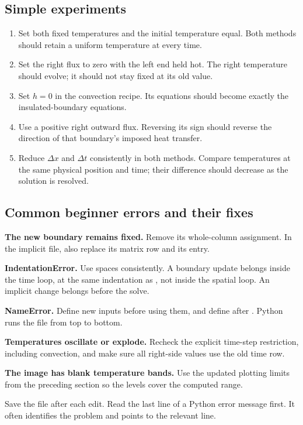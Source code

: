 \documentclass[11pt,letterpaper]{article}
\newcommand{\code}[1]{\texttt{\detokenize{#1}}}
\begin{document}
\subsection*{Simple experiments}
\begin{enumerate}
\item Set both fixed temperatures and the initial temperature equal.
      Both methods should retain a uniform temperature at every time.
\item Set the right flux to zero with the left end held hot. The right
      temperature should evolve; it should not stay fixed at its old value.
\item Set $h=0$ in the convection recipe. Its equations should become
      exactly the insulated-boundary equations.
\item Use a positive right outward flux. Reversing its sign should reverse
      the direction of that boundary's imposed heat transfer.
\item Reduce $\Delta x$ and $\Delta t$ consistently in both methods.
      Compare temperatures at the same physical position and time;
      their difference should decrease as the solution is resolved.
\end{enumerate}


\subsection*{Common beginner errors and their fixes}

\textbf{The new boundary remains fixed.}
Remove its whole-column assignment. In the implicit file, also replace its
matrix row and its \code{b} entry.

\textbf{IndentationError.}
Use spaces consistently. A boundary update belongs inside the time loop, at
the same indentation as \code{for i}, not inside the spatial loop. An implicit
\code{b} change belongs before the solve.

\textbf{NameError.}
Define new inputs before using them, and define \code{Bi} after \code{dx}.
Python runs the file from top to bottom.

\textbf{Temperatures oscillate or explode.}
Recheck the explicit time-step restriction, including convection, and make
sure all right-side values use the old time row.

\textbf{The image has blank temperature bands.}
Use the updated plotting limits from the preceding section so the levels cover
the computed range.

Save the file after each edit. Read the last line of a Python error message
first. It often identifies the problem and points to the relevant line.
\end{document}
